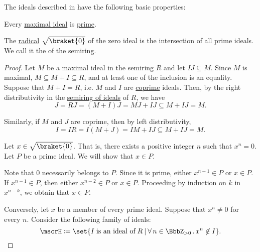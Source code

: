 \begin{proposition}\label{thm:def:semiring_ideal/properties}
  The ideals described in  have the following basic properties:
  \begin{thmenum}
     Every \hyperref[def:derived_semiring_ideals/maximal]{maximal ideal} is \hyperref[def:derived_semiring_ideals/prime]{prime}.

     The \hyperref[def:derived_semiring_ideals/radical]{radical} \( \sqrt {\braket{0}} \) of the zero ideal is the intersection of all prime ideals. We call it the  of the semiring.
  \end{thmenum}
\end{proposition}
\begin{proof}
   Let \( M \) be a maximal ideal in the semiring \( R \) and let \( IJ \subseteq M \). Since \( M \) is maximal, \( M \subseteq M + I \subseteq R \), and at least one of the inclusion is an equality. Suppose that \( M + I = R \), i.e. \( M \) and \( I \) are \hyperref[def:derived_semiring_ideals/coprime]{coprime} ideals. Then, by the right distributivity in the \hyperref[thm:semiring_of_ideals/lattice]{semiring of ideals} of \( R \), we have
  \begin{equation*}
    J = RJ = (M + I)J = MJ + IJ \subseteq M + IJ = M.
  \end{equation*}

  Similarly, if \( M \) and \( J \) are coprime, then by left distributivity,
  \begin{equation*}
    I = IR = I(M + J) = IM + IJ \subseteq M + IJ = M.
  \end{equation*}

  \SufficiencySubProof* Let \( x \in \sqrt{\braket{0}} \). That is, there exists a positive integer \( n \) such that \( x^n = 0 \). Let \( P \) be a prime ideal. We will show that \( x \in P \).

  Note that \( 0 \) necessarily belongs to \( P \). Since it is prime, either \( x^{n-1} \in P \) or \( x \in P \). If \( x^{n-1} \in P \), then either \( x^{n-2} \in P \) or \( x \in P \). Proceeding by induction on \( k \) in \( x^{n-k} \), we obtain that \( x \in P \).

  \NecessitySubProof* Conversely, let \( x \) be a member of every prime ideal. Suppose that \( x^n \neq 0 \) for every \( n \). Consider the following family of ideals:
  \begin{equation*}
    \mscrH \coloneqq \set{ I \T{is an ideal of} R \given \qforall {n \in \BbbZ_{>0}} x^n \not\in I }.
  \end{equation*}


\end{proof}

